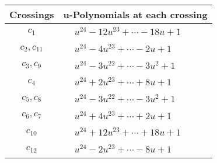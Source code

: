 \documentclass[1p]{elsarticle_modified}
\theoremstyle{definition}
\begin{document}
\begin{tabular}{m{50pt}|m{274pt}}
Crossings & \hspace{64pt}u-Polynomials at each crossing \\
\hline $$\begin{aligned}c_{1}\end{aligned}$$&$\begin{aligned}
&u^{24}-12 u^{23}+\cdots-18 u+1
\end{aligned}$\\
\hline $$\begin{aligned}c_{2},c_{11}\end{aligned}$$&$\begin{aligned}
&u^{24}-4 u^{23}+\cdots-2 u+1
\end{aligned}$\\
\hline $$\begin{aligned}c_{3},c_{9}\end{aligned}$$&$\begin{aligned}
&u^{24}-3 u^{22}+\cdots-3 u^2+1
\end{aligned}$\\
\hline $$\begin{aligned}c_{4}\end{aligned}$$&$\begin{aligned}
&u^{24}+2 u^{23}+\cdots+8 u+1
\end{aligned}$\\
\hline $$\begin{aligned}c_{5},c_{8}\end{aligned}$$&$\begin{aligned}
&u^{24}-3 u^{22}+\cdots-3 u^2+1
\end{aligned}$\\
\hline $$\begin{aligned}c_{6},c_{7}\end{aligned}$$&$\begin{aligned}
&u^{24}+4 u^{23}+\cdots+2 u+1
\end{aligned}$\\
\hline $$\begin{aligned}c_{10}\end{aligned}$$&$\begin{aligned}
&u^{24}+12 u^{23}+\cdots+18 u+1
\end{aligned}$\\
\hline $$\begin{aligned}c_{12}\end{aligned}$$&$\begin{aligned}
&u^{24}-2 u^{23}+\cdots-8 u+1
\end{aligned}$\\
\hline
\end{tabular}\\~\\
\end{document}
